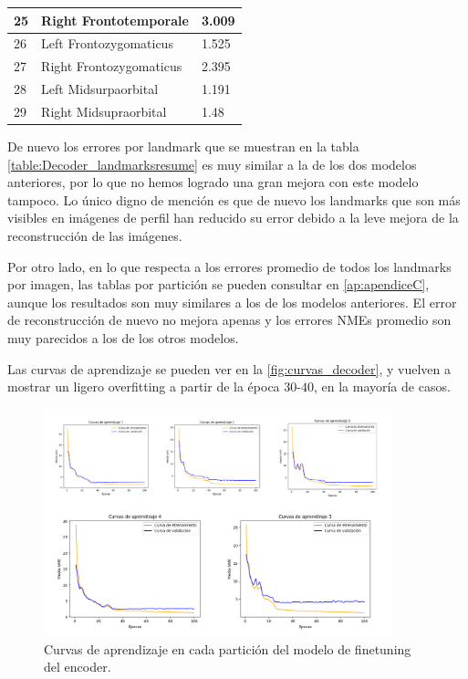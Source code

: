 \begin{table}[!ht]
\begin{tabular}{|l|l|l|}
                25 & Right Frontotemporale & 3.009 \\ \hline
                26 & Left Frontozygomaticus & 1.525 \\ \hline
                27 & Right Frontozygomaticus & 2.395 \\ \hline
                28 & Left Midsurpaorbital & 1.191 \\ \hline
                29 & Right Midsupraorbital & 1.48 \\ \hline
            \end{tabular}
            \label{table:Decoder_landmarksresume}
        \end{table}          
        
        \medskip 

        \noindent De nuevo los errores por landmark que se muestran en la tabla \autoref{table:Decoder_landmarksresume} es muy similar a la de los dos modelos anteriores, por lo que no hemos logrado una gran mejora con este modelo tampoco. Lo único digno de mención es que de nuevo los landmarks que son más visibles en imágenes de perfil han reducido su error debido a la leve mejora de la reconstrucción de las imágenes. 

        \medskip

        \noindent Por otro lado, en lo que respecta a los errores promedio de todos los landmarks por imagen, las tablas por partición se pueden consultar en \autoref{ap:apendiceC}, aunque los resultados son muy similares a los de los modelos anteriores. El error de reconstrucción de nuevo no mejora apenas y los errores NMEs promedio son muy parecidos a los de los otros modelos. 

        \medskip

        \noindent Las curvas de aprendizaje se pueden ver en la \autoref{fig:curvas_decoder}, y vuelven a mostrar un ligero overfitting a partir de la época $30$-$40$, en la mayoría de casos. 
        
        \begin{figure}[!h]
            \centering
            \includegraphics[width=0.9\textwidth]{img/curvas_decoder.png}
            \caption{Curvas de aprendizaje en cada partición del modelo de finetuning del encoder.}
            \label{fig:curvas_decoder}
        \end{figure}

